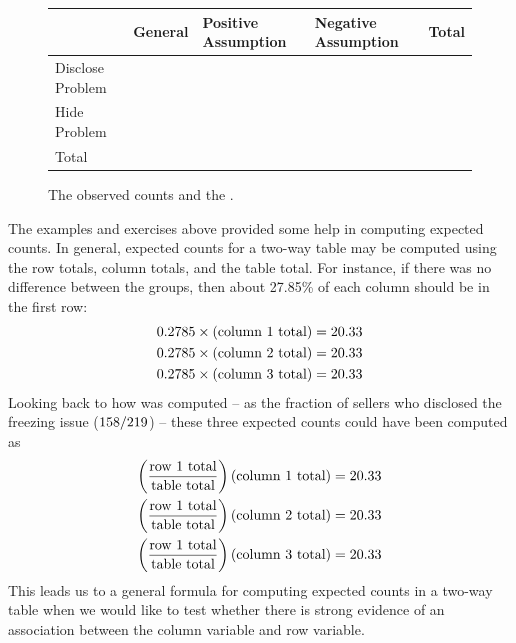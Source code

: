 \begin{figure}[h]
\centering
\begin{tabular}{l lll l}
  \hline
  & General & Positive Assumption &
      Negative Assumption & Total \\ 
  \hline
  Disclose Problem &
      \iPodAA{} \ \highlightO{\footnotesize(\iPodAExpected{})} &
      \iPodAB{} \highlightO{\footnotesize(\iPodAExpected{})} &
      \iPodAC{} \highlightO{\footnotesize(\iPodAExpected{})} &
      \iPodAD{} \\ 
  Hide Problem &
      \iPodBA{} \highlightO{\footnotesize(\iPodBExpected{})} &
      \iPodBB{} \highlightO{\footnotesize(\iPodBExpected{})} &
      \iPodBC{} \highlightO{\footnotesize(\iPodBExpected{})} &
      \iPodBD{} \\ 
  \hline
  Total & \iPodDA{} & \iPodDB{} &
      \iPodDC{} & \iPodDD{} \\
  \hline
\end{tabular}
\caption{The observed counts and the
    .}
\label{ipod_ask_data_summary_expected}
\end{figure}

The examples and exercises above provided some help
in computing expected counts.
In general, expected counts for a two-way table may
be computed using the row totals, column totals,
and the table total.
For instance, if there was no difference between the groups,
then about 27.85\% of each column should be in the first row:
\begin{align*}
0.2785{}\times (\text{column 1 total}) &= 20.33{} \\
0.2785{}\times (\text{column 2 total}) &= 20.33{} \\
0.2785{}\times (\text{column 3 total}) &= 20.33{}
\end{align*}
Looking back to how \iPodAFraction{} was computed --
as the fraction of sellers who disclosed the freezing issue
($158{}/219{}$) --
these three expected counts could have been computed as
\begin{align*}
\left(\frac{\text{row 1 total}}{\text{table total}}\right)\text{(column 1 total)} &= 20.33{} \\
\left(\frac{\text{row 1 total}}{\text{table total}}\right)\text{(column 2 total)} &= 20.33{} \\
\left(\frac{\text{row 1 total}}{\text{table total}}\right)\text{(column 3 total)} &= 20.33{}
\end{align*}
This leads us to a general formula for computing expected counts in a two-way table when we would like to test whether there is strong evidence of an association between the column variable and row variable.

